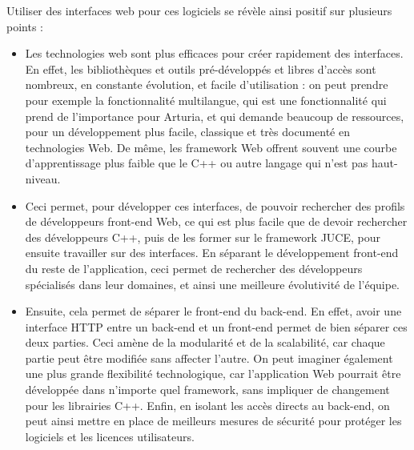 \documentclass[francais]{rapportPFE}  %
\begin{document}
Utiliser des interfaces web pour ces logiciels se révèle ainsi positif sur plusieurs points : 
\begin{itemize}
	\item Les technologies web sont plus efficaces pour créer rapidement des interfaces. En effet, les bibliothèques et outils pré-développés et libres d'accès sont nombreux, en constante évolution, et facile d'utilisation : on peut prendre pour exemple la fonctionnalité multilangue, qui est une fonctionnalité qui prend de l'importance pour Arturia, et qui demande beaucoup de ressources, pour un développement plus facile, classique et très documenté en technologies Web. De même, les framework Web offrent souvent une courbe d'apprentissage plus faible que le C++ ou autre langage qui n'est pas haut-niveau.
	\item Ceci permet, pour développer ces interfaces, de pouvoir rechercher des profils de développeurs front-end Web, ce qui est plus facile que de devoir rechercher des développeurs C++, puis de les former sur le framework JUCE, pour ensuite travailler sur des interfaces. En séparant le développement front-end du reste de l'application, ceci permet de rechercher des développeurs spécialisés dans leur domaines, et ainsi une meilleure évolutivité de l'équipe.
	\item Ensuite, cela permet de séparer le front-end du back-end. En effet, avoir une interface HTTP entre un back-end et un front-end permet de bien séparer ces deux parties. Ceci amène de la modularité et de la scalabilité, car chaque partie peut être modifiée sans affecter l'autre. On peut imaginer également une plus grande flexibilité technologique, car l'application Web pourrait être développée dans n'importe quel framework, sans impliquer de changement pour les librairies C++. Enfin, en isolant les accès directs au back-end, on peut ainsi mettre en place de meilleurs mesures de sécurité pour protéger les logiciels et les licences utilisateurs.
\end{itemize}






\end{document}
